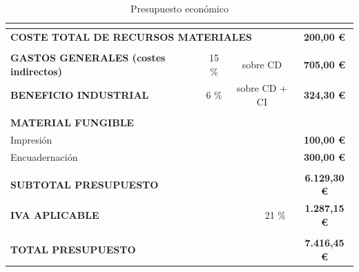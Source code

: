 \begin{table}[H]
{\begin{tabular}{lllllc}
& & & & & 
\multicolumn{1}{l}{} \\ 
\hline

\multicolumn{5}{|l|}{\textbf{COSTE TOTAL DE RECURSOS MATERIALES}} & 
\multicolumn{1}{c|}{\textbf{200,00 \euro}} \\ 
\hline

& & & & & 
\multicolumn{1}{l}{} \\  
\hline

\multicolumn{1}{|l|}{\textbf{GASTOS GENERALES (costes indirectos)}} & 
\multicolumn{1}{c|}{15 \%} & 
\multicolumn{3}{c|}{sobre CD} & 
\multicolumn{1}{c|}{\textbf{705,00 \euro}} \\ 
\hline

\multicolumn{1}{|l|}{\textbf{BENEFICIO INDUSTRIAL}} & 
\multicolumn{1}{c|}{6 \%} & 
\multicolumn{3}{c|}{sobre CD + CI} &
\multicolumn{1}{c|}{\textbf{324,30 \euro}} \\ 
\hline

& & & & & 
\multicolumn{1}{l}{} \\

\multicolumn{6}{l}{\textbf{MATERIAL FUNGIBLE}} \\
\hline 

\multicolumn{5}{|l|}{Impresión} & 
\multicolumn{1}{c|}{\textbf{100,00 \euro}} \\ 
\hline 

\multicolumn{5}{|l|}{Encuadernación} & 
\multicolumn{1}{c|}{\textbf{300,00 \euro}} \\ 
\hline

& & & & & 
\multicolumn{1}{l}{} \\
\hline

\multicolumn{5}{|l|}{\textbf{SUBTOTAL PRESUPUESTO}} & 
\multicolumn{1}{c|}{\textbf{6.129,30 \euro}} \\ 
\hline

\multicolumn{4}{|l|}{\textbf{IVA APLICABLE}} & 
\multicolumn{1}{c|}{21 \%} & 
\multicolumn{1}{c|}{\textbf{1.287,15 \euro}} \\ 
\hline

& & & & &
\multicolumn{1}{l}{} \\ 
\hline

\multicolumn{5}{|l|}{\textbf{TOTAL PRESUPUESTO}} & 
\multicolumn{1}{c|}{\textbf{7.416,45 \euro}} \\ 
\hline

\end{tabular}}
    \caption{Presupuesto económico}
    \label{presupuesto-economico}
    
\end{table}